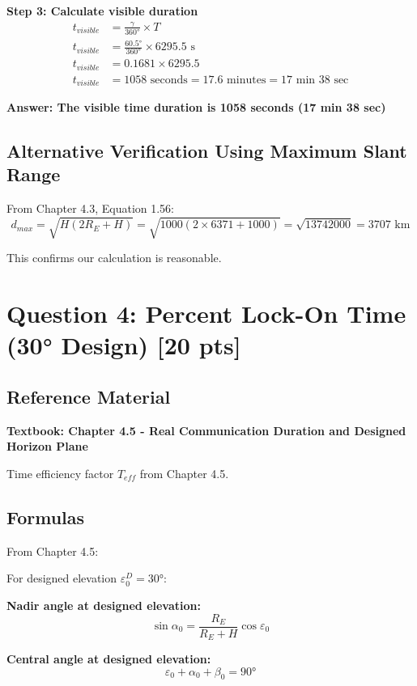 \documentclass[11pt,letterpaper]{article}
\begin{document}
\textbf{Step 3: Calculate visible duration}
\begin{align}
t_{visible} &= \frac{\gamma}{360°} \times T \\
t_{visible} &= \frac{60.5°}{360°} \times 6295.5 \text{ s} \\
t_{visible} &= 0.1681 \times 6295.5 \\
t_{visible} &= 1058 \text{ seconds} = 17.6 \text{ minutes} = 17 \text{ min } 38 \text{ sec}
\end{align}

\textbf{Answer: The visible time duration is 1058 seconds (17 min 38 sec)}

\subsection{Alternative Verification Using Maximum Slant Range}
From Chapter 4.3, Equation 1.56:
\begin{equation}
d_{max} = \sqrt{H(2R_E + H)} = \sqrt{1000(2 \times 6371 + 1000)} = \sqrt{13742000} = 3707 \text{ km}
\end{equation}

This confirms our calculation is reasonable.

\section{Question 4: Percent Lock-On Time (30° Design) [20 pts]}

\subsection{Reference Material}
\textbf{Textbook: Chapter 4.5 - Real Communication Duration and Designed Horizon Plane}

Time efficiency factor $T_{eff}$ from Chapter 4.5.

\subsection{Formulas}
From Chapter 4.5:

For designed elevation $\varepsilon_0^D = 30°$:

\textbf{Nadir angle at designed elevation:}
\begin{equation}
\sin \alpha_0 = \frac{R_E}{R_E + H} \cos \varepsilon_0
\end{equation}

\textbf{Central angle at designed elevation:}
\begin{equation}
\varepsilon_0 + \alpha_0 + \beta_0 = 90°
\end{equation}
\end{document}

